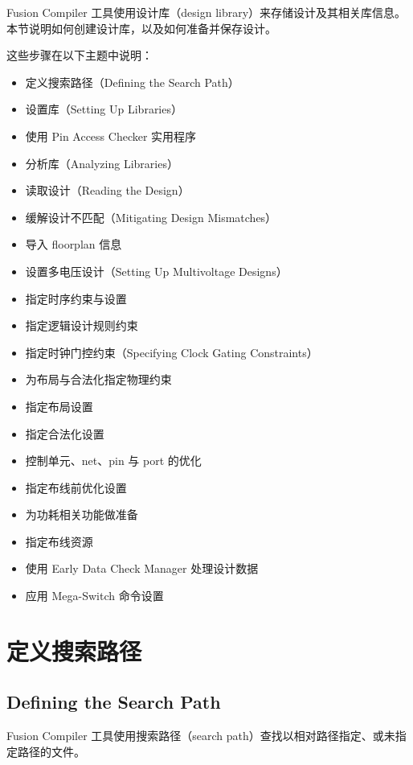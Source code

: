 \label{chap:prep}

Fusion Compiler 工具使用设计库（design library）来存储设计及其相关库信息。本节说明如何创建设计库，以及如何准备并保存设计。

这些步骤在以下主题中说明：
\begin{itemize}
  \item 定义搜索路径（Defining the Search Path）
  \item 设置库（Setting Up Libraries）
  \item 使用 Pin Access Checker 实用程序
  \item 分析库（Analyzing Libraries）
  \item 读取设计（Reading the Design）
  \item 缓解设计不匹配（Mitigating Design Mismatches）
  \item 导入 floorplan 信息
  \item 设置多电压设计（Setting Up Multivoltage Designs）
  \item 指定时序约束与设置
  \item 指定逻辑设计规则约束
  \item 指定时钟门控约束（Specifying Clock Gating Constraints）
  \item 为布局与合法化指定物理约束
  \item 指定布局设置
  \item 指定合法化设置
  \item 控制单元、net、pin 与 port 的优化
  \item 指定布线前优化设置
  \item 为功耗相关功能做准备
  \item 指定布线资源
  \item 使用 Early Data Check Manager 处理设计数据
  \item 应用 Mega-Switch 命令设置
\end{itemize}

\section{定义搜索路径}
\subsection*{Defining the Search Path}

Fusion Compiler 工具使用搜索路径（search path）查找以相对路径指定、或未指定路径的文件。

